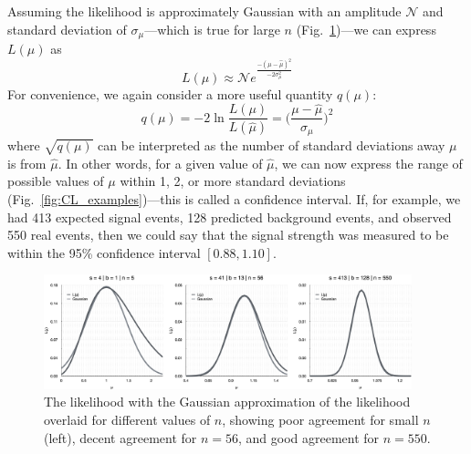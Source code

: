 Assuming the likelihood is approximately Gaussian\footnotemark{} with an amplitude $\mathcal{N}$ and standard deviation of $\sigma_\mu$---which is true for large $n$ (Fig.~\ref{fig:like_gauss_approx})---we can express $L(\mu)$ as
\begin{equation}
    L(\mu) \approx \mathcal{N}e^{\frac{-(\mu - \hat{\mu})^2}{-2\sigma^2_\mu}}
\end{equation}
For convenience, we again consider a more useful quantity $q(\mu)$:
\begin{equation}
    q(\mu) = -2\ln\frac{L(\mu)}{L(\hat{\mu})} = \bigg(\frac{\mu - \hat{\mu}}{\sigma_\mu}\bigg)^2
\end{equation}
where $\sqrt{q(\mu)}$ can be interpreted as the number of standard deviations away $\mu$ is from $\hat{\mu}$. 
In other words, for a given value of $\hat{\mu}$, we can now express the range of possible values of $\mu$ within 1, 2, or more standard deviations (Fig.~\ref{fig:CL_examples})---this is called a confidence interval. 
If, for example, we had 413 expected signal events, 128 predicted background events, and observed 550 real events, then we could say that the signal strength was measured to be within the 95\% confidence interval $[0.88, 1.10]$. 

\begin{figure}[htb]
    \centering
    \includegraphics[width=0.95\textwidth]{fig/stats/like_gauss_approx.png}
    \caption[The likelihood with the Gaussian approximation of the likelihood overlaid.]{
        The likelihood with the Gaussian approximation of the likelihood overlaid for different values of $n$, showing poor agreement for small $n$ (left), decent agreement for $n = 56$, and good agreement for $n = 550$.
    }
    \label{fig:like_gauss_approx}
\end{figure}

